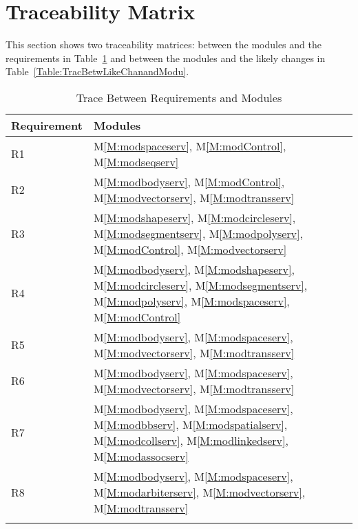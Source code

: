 \documentclass[12pt]{article}
\begin{document}
\section{Traceability Matrix}
\label{Sec:TracMatr}
This section shows two traceability matrices: between the modules and the requirements in Table~\ref{Table:TracBetwRequandModu} and between the modules and the likely changes in Table~\ref{Table:TracBetwLikeChanandModu}.
\begin{longtable}{l l}
\toprule
Requirement & Modules
\\
\midrule
R1 & M\ref{M:modspaceserv}, M\ref{M:modControl}, M\ref{M:modseqserv}
\\
R2 & M\ref{M:modbodyserv}, M\ref{M:modControl}, M\ref{M:modvectorserv}, M\ref{M:modtransserv}
\\
R3 & M\ref{M:modshapeserv}, M\ref{M:modcircleserv}, M\ref{M:modsegmentserv}, M\ref{M:modpolyserv}, M\ref{M:modControl}, M\ref{M:modvectorserv}
\\
R4 & M\ref{M:modbodyserv}, M\ref{M:modshapeserv}, M\ref{M:modcircleserv}, M\ref{M:modsegmentserv}, M\ref{M:modpolyserv}, M\ref{M:modspaceserv}, M\ref{M:modControl}
\\
R5 & M\ref{M:modbodyserv}, M\ref{M:modspaceserv}, M\ref{M:modvectorserv}, M\ref{M:modtransserv}
\\
R6 & M\ref{M:modbodyserv}, M\ref{M:modspaceserv}, M\ref{M:modvectorserv}, M\ref{M:modtransserv}
\\
R7 & M\ref{M:modbodyserv}, M\ref{M:modspaceserv}, M\ref{M:modbbserv}, M\ref{M:modspatialserv}, M\ref{M:modcollserv}, M\ref{M:modlinkedserv}, M\ref{M:modassocserv}
\\
R8 & M\ref{M:modbodyserv}, M\ref{M:modspaceserv}, M\ref{M:modarbiterserv}, M\ref{M:modvectorserv}, M\ref{M:modtransserv}
\\
\bottomrule
\caption{Trace Between Requirements and Modules}
\label{Table:TracBetwRequandModu}
\end{longtable}
\end{document}
